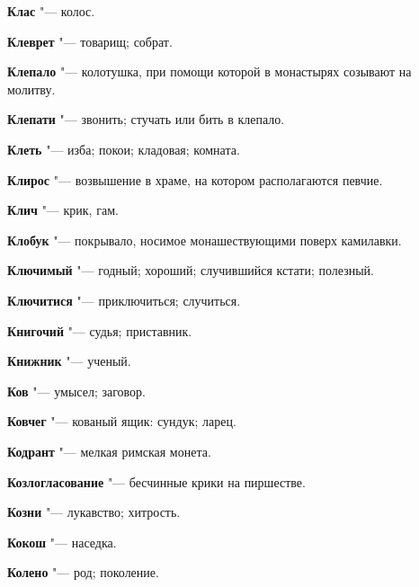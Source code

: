 \begin{mymulticols}{2}
\noindent\textbf{Клас} "--- колос. 




\noindent\textbf{Клеврет} "--- товарищ; собрат. 




\noindent\textbf{Клепало} "--- колотушка, при помощи которой в монастырях созывают на молитву. 




\noindent\textbf{Клепати} "--- звонить; стучать или бить в клепало. 




\noindent\textbf{Клеть} "--- изба; покои; кладовая; комната. 




\noindent\textbf{Клирос} "--- возвышение в храме, на котором располагаются певчие. 




\noindent\textbf{Клич} "--- крик, гам. 




\noindent\textbf{Клобук} "--- покрывало, носимое монашествующими поверх камилавки. 




\noindent\textbf{Ключимый} "--- годный; хороший; случившийся кстати; полезный. 




\noindent\textbf{Ключитися} "--- приключиться; случиться. 




\noindent\textbf{Книгочий} "--- судья; приставник. 




\noindent\textbf{Книжник} "--- ученый. 




\noindent\textbf{Ков} "--- умысел; заговор. 




\noindent\textbf{Ковчег} "--- кованый ящик: сундук; ларец. 




\noindent\textbf{Кодрант} "--- мелкая римская монета. 




\noindent\textbf{Козлогласование} "--- бесчинные крики на пиршестве. 




\noindent\textbf{Козни} "--- лукавство; хитрость. 




\noindent\textbf{Кокош} "--- наседка. 




\noindent\textbf{Колено} "--- род; поколение. 





\end{mymulticols}
